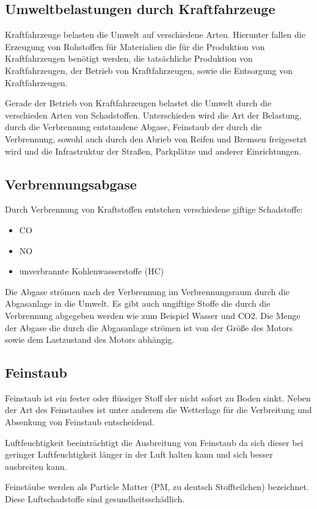 \subsection{Umweltbelastungen durch Kraftfahrzeuge}
Kraftfahrzeuge belasten die Umwelt auf verschiedene Arten.
Hierunter fallen
die Erzeugung von Rohstoffen für Materialien die für die Produktion von Kraftfahrzeugen benötigt werden,
die tatsächliche Produktion von Kraftfahrzeugen,
der Betrieb von Kraftfahrzeugen,
sowie die Entsorgung von Kraftfahrzeugen.

Gerade der Betrieb von Kraftfahrzeugen belastet die Umwelt durch die verschieden Arten von Schadstoffen.
Unterschieden wird die Art der Belastung,
durch die Verbrennung entstandene Abgase,
Feinstaub der durch die Verbrennung, sowohl auch durch den Abrieb von Reifen und Bremsen freigesetzt wird
und die Infrastruktur der Straßen, Parkplätze und anderer Einrichtungen.

\subsection{Verbrennungsabgase}
Durch Verbrennung von Kraftstoffen entstehen verschiedene giftige Schadstoffe:
\begin{itemize}
	\item {\ac{CO}}
	\item {\ac{NO}}
	\item unverbrannte Kohlenwasserstoffe (HC)
\end{itemize}
Die Abgase strömen nach der Verbrennung im Verbrennungsraum durch die Abgasanlage in die Umwelt.
Es gibt auch ungiftige Stoffe die durch die Verbrennung abgegeben werden wie zum Beispiel \ac{Wasser} und \ac{CO2}.
Die Menge der Abgase die durch die Abgasanlage strömen ist von der Größe des Motors sowie dem Lastzustand des Motors abhängig.

\subsection{Feinstaub}
Feinstaub ist ein fester oder flüssiger Stoff der nicht sofort zu Boden sinkt.
Neben der Art des Feinstaubes ist unter anderem die Wetterlage für die Verbreitung und Absenkung von Feinstaub entscheidend.

Luftfeuchtigkeit beeinträchtigt die Ausbreitung von Feinstaub da sich dieser bei geringer Luftfeuchtigkeit länger in der Luft halten kann und sich besser ausbreiten kann.

Feinstäube werden als Particle Matter (PM, zu deutsch Stoffteilchen) bezeichnet. Diese Luftschadstoffe sind gesundheitsschädlich.

